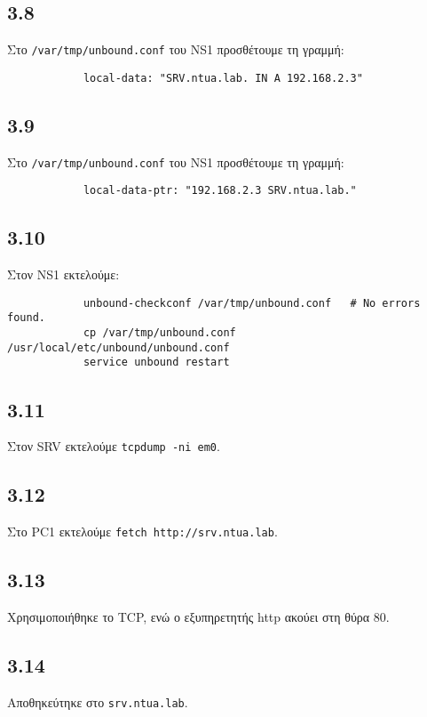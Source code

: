 \documentclass[a4paper, 12pt]{article}
\begin{document}
	\subsection*{3.8}
		Στο \verb|/var/tmp/unbound.conf| του NS1 προσθέτουμε τη γραμμή:
		
		\begin{verbatim}
			local-data: "SRV.ntua.lab. IN A 192.168.2.3"
		\end{verbatim}
		
	\subsection*{3.9}
		Στο \verb|/var/tmp/unbound.conf| του NS1 προσθέτουμε τη γραμμή:
		
		\begin{verbatim}
			local-data-ptr: "192.168.2.3 SRV.ntua.lab."
		\end{verbatim}

	\subsection*{3.10}
		Στον NS1 εκτελούμε:
		
		\begin{verbatim}
			unbound-checkconf /var/tmp/unbound.conf   # No errors found.
			cp /var/tmp/unbound.conf /usr/local/etc/unbound/unbound.conf
			service unbound restart
		\end{verbatim}

	\subsection*{3.11}
		Στον SRV εκτελούμε \verb|tcpdump -ni em0|.

	\subsection*{3.12}
		Στο PC1 εκτελούμε \verb|fetch http://srv.ntua.lab|.

	\subsection*{3.13}
		Χρησιμοποιήθηκε το TCP, ενώ ο εξυπηρετητής http ακούει στη θύρα 80.
		
	\subsection*{3.14}
		Αποθηκεύτηκε στο \verb|srv.ntua.lab|.
		
\end{document}
